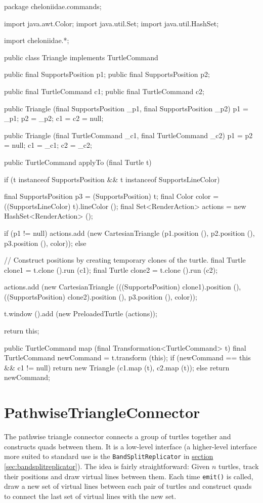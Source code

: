 \documentclass{report}
\newcommand{\Ref}[2]{\hyperref[#2]{#1 \ref*{#2}}}
\begin{document}
\begin{javacode}
package cheloniidae.commands;

import java.awt.Color;
import java.util.Set;
import java.util.HashSet;

import cheloniidae.*;

public class Triangle implements TurtleCommand {
  public final SupportsPosition p1;
  public final SupportsPosition p2;

  public final TurtleCommand c1;
  public final TurtleCommand c2;

  public Triangle (final SupportsPosition _p1, final SupportsPosition _p2) {
    p1 = _p1; p2 = _p2;
    c1 = c2 = null;
  }

  public Triangle (final TurtleCommand _c1, final TurtleCommand _c2) {
    p1 = p2 = null;
    c1 = _c1; c2 = _c2;
  }

  public TurtleCommand applyTo (final Turtle t) {
    if (t instanceof SupportsPosition && t instanceof SupportsLineColor) {
      final SupportsPosition  p3      = (SupportsPosition) t;
      final Color             color   = ((SupportsLineColor) t).lineColor ();
      final Set<RenderAction> actions = new HashSet<RenderAction> ();

      if (p1 != null) actions.add (new CartesianTriangle (p1.position (), p2.position (), p3.position (), color));
      else {
        // Construct positions by creating temporary clones of the turtle.
        final Turtle clone1 = t.clone ().run (c1);
        final Turtle clone2 = t.clone ().run (c2);

        actions.add (new CartesianTriangle (((SupportsPosition) clone1).position (),
                                            ((SupportsPosition) clone2).position (),
                                            p3.position (), color));
      }

      t.window ().add (new PreloadedTurtle (actions));
    }

    return this;
  }

  public TurtleCommand map (final Transformation<TurtleCommand> t) {
    final TurtleCommand newCommand = t.transform (this);
    if (newCommand == this && c1 != null) return new Triangle (c1.map (t), c2.map (t));
    else                                  return newCommand;
  }
}
\end{javacode}

\section {PathwiseTriangleConnector} \label{sec:pathwisetriangleconnector}
      The pathwise triangle connector connects a group of turtles together and constructs quads between them. It is a low-level interface (a higher-level
      interface more suited to standard use is the {\tt BandSplitReplicator} in \Ref{section}{sec:bandsplitreplicator}). The idea is fairly straightforward:
      Given $n$ turtles, track their positions and draw virtual lines between them. Each time {\tt emit()} is called, draw a new set of virtual lines between
      each pair of turtles and construct quads to connect the last set of virtual lines with the new set.
\end{document}
